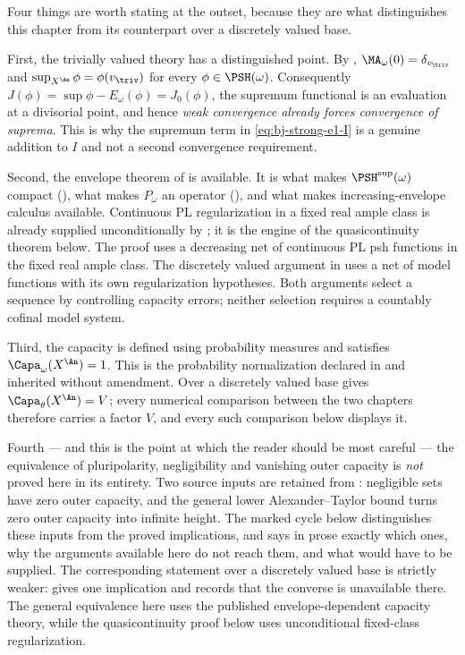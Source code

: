 Four things are worth stating at the outset, because they are what
distinguishes this chapter from its counterpart
over a discretely valued base.

First, the trivially valued theory has a distinguished point.  By
, $\MA_\omega(0)=\delta_{v_{\triv}}$
and $\sup_{X^{\An}}\phi=\phi(v_{\triv})$ for every $\phi\in\PSH(\omega)$.
Consequently $J(\phi)=\sup\phi-E_\omega(\phi)=J_0(\phi)$, the supremum
functional is an evaluation at a divisorial point, and hence \emph{weak
convergence already forces convergence of suprema}.  This is why the
supremum term in \eqref{eq:bj-strong-e1-I} is a genuine addition to $I$
and not a second convergence requirement.

Second, the envelope theorem of
 is
available.  It is what makes $\PSH^{\sup}(\omega)$ compact
(), what makes $P_\omega$ an operator
(), and what makes increasing-envelope
calculus available.  Continuous PL regularization in a fixed real ample
class is already supplied unconditionally by
; it is the engine of the
quasicontinuity theorem below. The proof uses a decreasing net of
continuous PL psh functions in the fixed real ample class. The
discretely valued argument in  uses
a net of model functions with its own regularization hypotheses.
Both arguments select a sequence by controlling capacity errors;
neither selection requires a countably cofinal model system.

Third, the capacity is defined using probability measures and satisfies
$\Capa_\omega(X^{\An})=1$.  This is the probability normalization
declared in  and inherited without
amendment.  Over a discretely valued base  gives
$\Capa_\theta(X^{\An})=V$; every numerical comparison between the two
chapters therefore carries a factor $V$, and every such comparison below
displays it.

Fourth --- and this is the point at which the reader should be most
careful --- the equivalence of pluripolarity, negligibility and vanishing
outer capacity is \emph{not} proved here in its entirety.  Two source inputs are retained from \cite{BJ22}: negligible sets
have zero outer capacity, and the general lower Alexander--Taylor
bound turns zero outer capacity into infinite height. The marked
cycle below distinguishes these inputs from the proved implications, and
 says in prose exactly which ones, why the
arguments available here do not reach them, and what would have to be
supplied.  The corresponding statement over a discretely valued base is
strictly weaker:  gives one implication and
 records that the converse is unavailable
there. The general equivalence here uses the published
envelope-dependent capacity theory, while the quasicontinuity proof
below uses unconditional fixed-class regularization.

